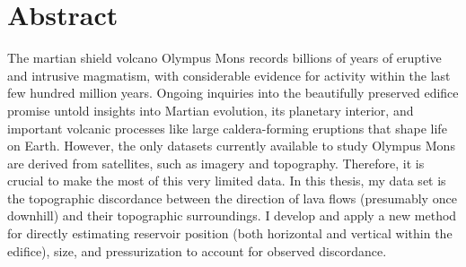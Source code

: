 \chapter{Abstract}
The martian shield volcano Olympus Mons records billions of years of eruptive and intrusive magmatism, with considerable evidence for activity within the last few hundred million years. Ongoing inquiries into the beautifully preserved edifice promise untold insights into Martian evolution, its planetary interior, and important volcanic processes like large caldera-forming eruptions that shape life on Earth. However, the only datasets currently available to study Olympus Mons are derived from satellites, such as imagery and topography. Therefore, it is crucial to make the most of this very limited data. In this thesis, my data set is the topographic discordance between the direction of lava flows (presumably once downhill) and their topographic surroundings. I develop and apply a new method for directly estimating reservoir position (both horizontal and vertical within the edifice), size, and pressurization to account for observed discordance.